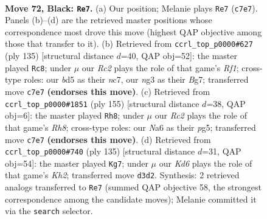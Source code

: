 \documentclass[11pt]{article}
\begin{document}
\clearpage

\begin{figure}[p]\centering
\begin{subfigure}{0.46\textwidth}\centering
\resizebox{\linewidth}{!}{%
\newchessgame
\chessboard[
  setfen={8/2r2p2/n5p1/3BP2p/b4Pp1/3k2N1/5K1P/8 b - - 3 72},
  showmover=false,
  pgfstyle=straightmove, color=movearrow, markmove={c7-e7}
]}
\caption{}
\end{subfigure}\hfill
\begin{subfigure}{0.46\textwidth}\centering
\resizebox{\linewidth}{!}{%
\newchessgame
\chessboard[
  setfen={5r2/2N2pb1/1p2p3/1P1pP2k/3P4/1K5P/8/R7 b - - 8 68},
  showmover=false,
  pgfstyle=straightmove, color=movearrow, markmove={f8-c8}
]}
\caption{}
\end{subfigure}
\\[4pt]
\begin{subfigure}{0.46\textwidth}\centering
\resizebox{\linewidth}{!}{%
\newchessgame
\chessboard[
  setfen={8/4kp2/4p3/3pN1P1/3P2B1/4P3/6K1/7r b - - 14 78},
  showmover=false,
  pgfstyle=straightmove, color=movearrow, markmove={h1-h8}
]}
\caption{}
\end{subfigure}\hfill
\begin{subfigure}{0.46\textwidth}\centering
\resizebox{\linewidth}{!}{%
\newchessgame
\chessboard[
  setfen={8/5p1k/1p4p1/3B3p/P4N1P/6P1/7K/4r3 b - - 0 68},
  showmover=false,
  pgfstyle=straightmove, color=movearrow, markmove={h7-g7}
]}
\caption{}
\end{subfigure}
\caption{\textbf{Move 72, Black: \texttt{Re7}.} (a) Our position; Melanie plays \texttt{Re7} (\texttt{c7e7}). Panels (b)--(d) are the retrieved master positions whose correspondence most drove this move (highest QAP objective among those that transfer to it). (b) Retrieved from \texttt{ccrl\_top\_p0000\#627} (ply 135) [structural distance $d$=40, QAP obj=52]: the master played \texttt{Rc8}; under $\mu$ our \emph{Rc2} plays the role of that game's \emph{Rf1}; cross-type roles: our \emph{b}d5 as their \emph{n}c7, our \emph{n}g3 as their \emph{B}g7; transferred move \texttt{c7e7} \textbf{(endorses this move)}. (c) Retrieved from \texttt{ccrl\_top\_p0000\#1851} (ply 155) [structural distance $d$=38, QAP obj=6]: the master played \texttt{Rh8}; under $\mu$ our \emph{Rc2} plays the role of that game's \emph{Rh8}; cross-type roles: our \emph{N}a6 as their \emph{p}g5; transferred move \texttt{c7e7} \textbf{(endorses this move)}. (d) Retrieved from \texttt{ccrl\_top\_p0000\#740} (ply 135) [structural distance $d$=31, QAP obj=54]: the master played \texttt{Kg7}; under $\mu$ our \emph{Kd6} plays the role of that game's \emph{Kh2}; transferred move \texttt{d3d2}. Synthesis: 2 retrieved analogs transferred to \texttt{Re7} (summed QAP objective 58, the strongest correspondence among the candidate moves); Melanie committed it via the \texttt{search} selector.}
\label{fig:thought-m143}
\end{figure}
\end{document}
